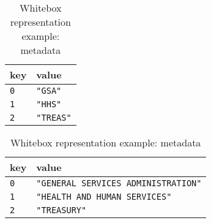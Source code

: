 \begin{table}[h]
\centering
\begin{minipage}{.25\linewidth}
\centering
\begin{tabular}{@{}ll@{}}
\toprule
key      & value          \\ \midrule
\verb|0| & \verb|"GSA"|   \\
\verb|1| & \verb|"HHS"|   \\
\verb|2| & \verb|"TREAS"| \\ \bottomrule
\end{tabular}
\caption*{\(dict_{AP}\)}
\end{minipage}%
\begin{minipage}{.6\linewidth}
\centering
\begin{tabular}{@{}ll@{}}
\toprule
key      & value                                    \\ \midrule
\verb|0| & \verb|"GENERAL SERVICES ADMINISTRATION"| \\
\verb|1| & \verb|"HEALTH AND HUMAN SERVICES"|       \\
\verb|2| & \verb|"TREASURY"|                        \\ \bottomrule
\end{tabular}
\caption*{\(dict_{BP}\)}
\end{minipage}
\caption{Whitebox representation example: metadata}
\label{tab:exprlang:exprlang_3}
\end{table}